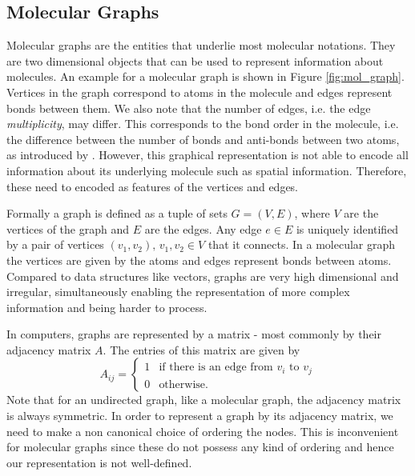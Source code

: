 \subsection{Molecular Graphs}
\label{sec:mol_graphs}
Molecular graphs are the entities that underlie most molecular notations. They are two dimensional objects that can be used to represent information about molecules. An example for a molecular graph is shown in Figure \ref{fig:mol_graph}. Vertices in the graph correspond to atoms in the molecule and edges represent bonds between them. We also note that the number of edges, i.e. the edge \emph{multiplicity}, may differ. This corresponds to the bond order in the molecule, i.e. the difference between the number of bonds and anti-bonds between two atoms, as introduced by \cite{pauling}. However, this graphical representation is not able to encode all information about its underlying molecule such as spatial information. Therefore, these need to encoded as features of the vertices and edges.

Formally a graph is defined as a tuple of sets $G = (V,E)$, where $V$ are the vertices of the graph and $E$ are the edges. Any edge $e \in E$ is uniquely identified by a pair of vertices $(v_1, v_2), \, v_1, v_2 \in V$ that it connects. In a molecular graph the vertices are given by the atoms and edges represent bonds between atoms. Compared to data structures like vectors, graphs are very high dimensional and irregular, simultaneously enabling the representation of more complex information and being harder to process.

In computers, graphs are represented by a matrix - most commonly by their adjacency matrix $A$. The entries of this matrix are given by 
\begin{equation}
A_{ij} = 
\begin{cases}
1 & \text{if there is an edge from } v_i \text{ to } v_j \\
0 & \text{otherwise.}
\end{cases}
\end{equation}
Note that for an undirected graph, like a molecular graph, the adjacency matrix is always symmetric. In order to represent a graph by its adjacency matrix, we need to make a non canonical choice of ordering the nodes. This is inconvenient for molecular graphs since these do not possess any kind of ordering and hence our representation is not well-defined. 

